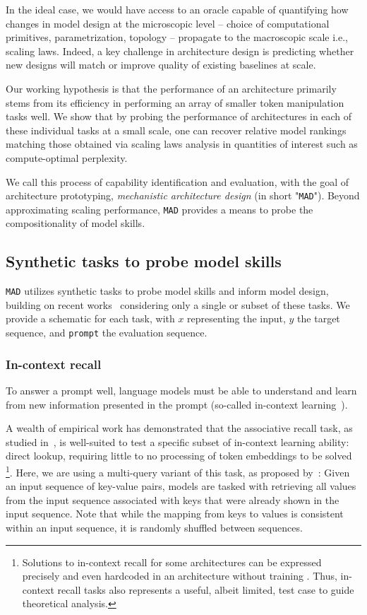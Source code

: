 In the ideal case, we would have access to an oracle capable of quantifying how changes in model design at the microscopic level -- choice of computational primitives, parametrization, topology -- propagate to the macroscopic scale i.e., scaling laws. Indeed, a key challenge in architecture design is predicting whether new designs will match or improve quality of existing baselines at scale. 

Our working hypothesis is that the performance of an architecture primarily stems from its efficiency in performing an array of smaller token manipulation tasks well. We show that by probing the performance of architectures in each of these individual tasks at a small scale, one can recover relative model rankings matching those obtained via scaling laws analysis in quantities of interest such as compute-optimal perplexity.

We call this process of capability identification and evaluation, with the goal of architecture prototyping, \textit{mechanistic architecture design} (in short "{\tt MAD}"). Beyond approximating scaling performance, {\tt MAD} provides a means to probe the compositionality of model skills.

\subsection{Synthetic tasks to probe model skills}
{\tt MAD} utilizes synthetic tasks to probe model skills and inform model design, building on recent works~\cite{fu2022hungry,poli2023hyena,arora2023zoology} considering only a single or subset of these tasks. We provide a schematic for each task, with $x$ representing the input, $y$ the target sequence, and {\tt prompt} the evaluation sequence.

\subsubsection{In-context recall}

To answer a prompt well, language models must be able to understand and learn from new information presented in the prompt (so-called in-context learning~\cite{elhage2021mathematical}).

A wealth of empirical work has demonstrated that the associative recall task, as studied in~\cite{fu2022hungry,poli2023hyena}, is well-suited to test a specific subset of in-context learning ability: direct lookup, requiring little to no processing of token embeddings to be solved \footnote{Solutions to in-context recall for some architectures can be expressed precisely and even hardcoded in an architecture without training \cite{massaroli2023laughing,arora2023zoology}. Thus, in-context recall tasks also represents a useful, albeit limited, test case to guide theoretical analysis.}. Here, we are using a multi-query variant of this task, as proposed by~\cite{arora2023zoology}: Given an input sequence of key-value pairs, models are tasked with retrieving all values from the input sequence associated with keys that were already shown in the input sequence. Note that while the mapping from keys to values is consistent within an input sequence, it is randomly shuffled between sequences.

